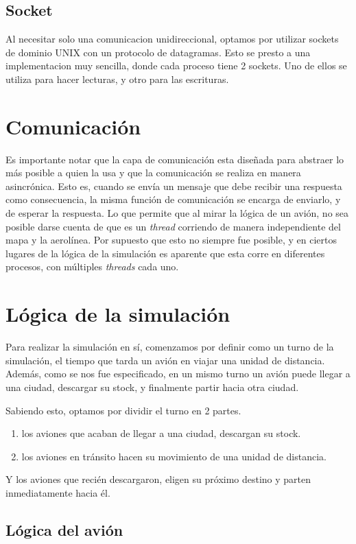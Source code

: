 \documentclass[a4paper,10pt]{article}
\begin{document}
\subsection{Socket}
Al necesitar solo una comunicacion unidireccional, optamos por utilizar sockets de dominio UNIX con un protocolo de datagramas.
Esto se presto a una implementacion muy sencilla, donde cada proceso tiene 2 sockets.
Uno de ellos se utiliza para hacer lecturas, y otro para las escrituras.

\newpage
\section{Comunicación}
Es importante notar que la capa de comunicación esta diseñada para abstraer lo más posible a quien la usa y que la comunicación se realiza en manera asincrónica.
Esto es, cuando se envía un mensaje que debe recibir una respuesta como consecuencia, la misma función de comunicación se encarga de enviarlo, y de esperar 
la respuesta. Lo que permite que al mirar la lógica de un avión, no sea posible darse cuenta de que es un \textit{thread} corriendo de manera independiente del mapa y
 la aerolínea. Por supuesto que esto no siempre fue posible, y en ciertos lugares de la lógica de la simulación es aparente que esta corre en diferentes procesos,
 con múltiples \textit{threads} cada uno.

\newpage
\section{Lógica de la simulación}
Para realizar la simulación en sí, comenzamos por definir como un turno de la simulación, el tiempo que tarda un avión en viajar una unidad de distancia.
Además, como se nos fue especificado, en un mismo turno un avión puede llegar a una ciudad, descargar su stock, y finalmente partir hacia otra ciudad.

Sabiendo esto, optamos por dividir el turno en 2 partes.
\begin{enumerate}
  \item los aviones que acaban de llegar a una ciudad, descargan su stock.
  \item los aviones en tránsito hacen su movimiento de una unidad de distancia.
\end{enumerate}

Y los aviones que recién descargaron, eligen su próximo destino y parten inmediatamente hacia él.

\subsection{Lógica del avión}
\end{document}
